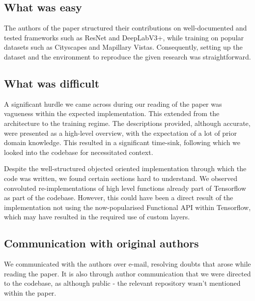 \subsection*{What was easy}

The authors of the paper structured their contributions on well-documented and tested frameworks such as ResNet and DeepLabV3+, while training on popular datasets such as Cityscapes and Mapillary Vistas. Consequently, setting up the dataset and the environment to reproduce the given research was straightforward.


\subsection*{What was difficult}

A significant hurdle we came across during our reading of the paper was vagueness within the expected implementation. This extended from the architecture to the training regime. The descriptions provided, although accurate, were presented as a high-level overview, with the expectation of a lot of prior domain knowledge. This resulted in a significant time-sink, following which we looked into the codebase for necessitated context.

Despite the well-structured objected oriented implementation through which the code was written, we found certain sections hard to understand. We observed convoluted re-implementations of high level functions already part of Tensorflow as part of the codebase. However, this could have been a direct result of the implementation not using the now-popularised Functional API within Tensorflow, which may have resulted in the required use of custom layers. %



\subsection*{Communication with original authors}

We communicated with the authors over e-mail, resolving doubts that arose while reading the paper. It is also through author communication that we were directed to the codebase, as although public - the relevant repository wasn't mentioned within the paper.
